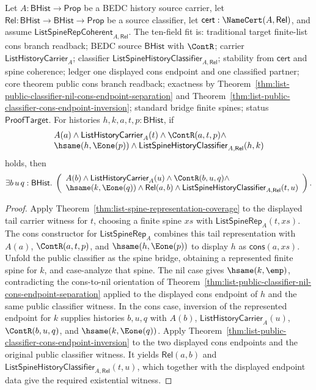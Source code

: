 \begin{theorem}
\label{thm:list-public-classifier-cons-branch-readback}
Let $A:\mathsf{BHist}\to\mathsf{Prop}$ be a BEDC history source carrier, let
$\mathsf{Rel}:\mathsf{BHist}\to\mathsf{BHist}\to\mathsf{Prop}$ be a source
classifier, let $\mathsf{cert}:\NameCert(A,\mathsf{Rel})$, and assume
$\mathsf{ListSpineRepCoherent}_{A,\mathsf{Rel}}$. The ten-field fit is:
traditional target finite-list cons branch readback; BEDC source
$\mathsf{BHist}$ with $\ContR$; carrier $\mathsf{ListHistoryCarrier}_A$;
classifier $\mathsf{ListSpineHistoryClassifier}_{A,\mathsf{Rel}}$; stability
from $\mathsf{cert}$ and spine coherence; ledger one displayed cons endpoint
and one classified partner; core theorem public cons branch readback; exactness
by Theorem~\ref{thm:list-public-classifier-nil-cons-endpoint-separation} and
Theorem~\ref{thm:list-public-classifier-cons-endpoint-inversion}; standard
bridge finite spines; status $\mathsf{ProofTarget}$. For histories
$h,k,a,t,p:\mathsf{BHist}$, if
$$
\begin{array}{l}
A(a)\land \mathsf{ListHistoryCarrier}_A(t)\land
\ContR(a,t,p)\land\\
\hsame(h,\Eone(p))\land
\mathsf{ListSpineHistoryClassifier}_{A,\mathsf{Rel}}(h,k)
\end{array}
$$
holds, then
$$
\exists b\,u\,q:\mathsf{BHist}.\;
\left(
\begin{array}{l}
A(b)\land \mathsf{ListHistoryCarrier}_A(u)\land
\ContR(b,u,q)\land\\
\hsame(k,\Eone(q))\land \mathsf{Rel}(a,b)\land
\mathsf{ListSpineHistoryClassifier}_{A,\mathsf{Rel}}(t,u)
\end{array}
\right).
$$
\end{theorem}
\begin{proof}
Apply Theorem~\ref{thm:list-spine-representation-coverage} to the displayed
tail carrier witness for $t$, choosing a finite spine $xs$ with
$\mathsf{ListSpineRep}_A(t,xs)$. The cons constructor for
$\mathsf{ListSpineRep}_A$ combines this tail representation with $A(a)$,
$\ContR(a,t,p)$, and $\hsame(h,\Eone(p))$ to display $h$ as
$\mathsf{cons}(a,xs)$. Unfold the public classifier as the spine bridge,
obtaining a represented finite spine for $k$, and case-analyze that spine. The
nil case gives $\hsame(k,\emp)$, contradicting the cons-to-nil orientation of
Theorem~\ref{thm:list-public-classifier-nil-cons-endpoint-separation} applied
to the displayed cons endpoint of $h$ and the same public classifier witness.
In the cons case, inversion of the represented endpoint for $k$ supplies
histories $b,u,q$ with $A(b)$, $\mathsf{ListHistoryCarrier}_A(u)$,
$\ContR(b,u,q)$, and $\hsame(k,\Eone(q))$. Apply
Theorem~\ref{thm:list-public-classifier-cons-endpoint-inversion} to the two
displayed cons endpoints and the original public classifier witness. It yields
$\mathsf{Rel}(a,b)$ and
$\mathsf{ListSpineHistoryClassifier}_{A,\mathsf{Rel}}(t,u)$, which together
with the displayed endpoint data give the required existential witness.
\end{proof}

